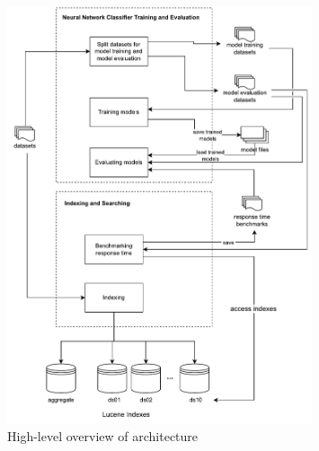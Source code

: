 \documentclass[conference]{IEEEtran}
\begin{document}
\begin{figure}[!th]
	\centering
%	
	\includegraphics[width=0.8\textwidth]{graphics/overall_architecture.pdf}
	\caption{High-level overview of architecture}
	\label{fig:proj_arch}
\end{figure}
\end{document}
